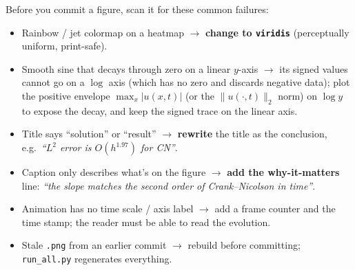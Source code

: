 \documentclass[11pt]{article}
\begin{document}
Before you commit a figure, scan it for these common failures:
\begin{itemize}[leftmargin=2em, itemsep=1pt]
  \item Rainbow / jet colormap on a heatmap $\to$ \textbf{change to
        \texttt{viridis}} (perceptually uniform, print-safe).
  \item Smooth sine that decays through zero on a linear $y$-axis $\to$
        its signed values cannot go on a $\log$ axis (which has no zero
        and discards negative data); plot the positive envelope
        $\max_x|u(x,t)|$ (or the $\|u(\cdot,t)\|_2$ norm) on $\log y$ to
        expose the decay, and keep the signed trace on the linear axis.
  \item Title says ``solution'' or ``result'' $\to$ \textbf{rewrite} the
        title as the conclusion, e.g.\ \emph{``$L^2$ error is
        $O(h^{1.97})$ for CN''}.
  \item Caption only describes what's on the figure $\to$ \textbf{add
        the why-it-matters} line: \emph{``the slope matches the second
        order of Crank--Nicolson in time''}.
  \item Animation has no time scale / axis label $\to$ add a frame
        counter and the time stamp; the reader must be able to read
        the evolution.
  \item Stale \texttt{.png} from an earlier commit $\to$ rebuild before
        committing; \texttt{run\_all.py} regenerates everything.
\end{itemize}
\end{document}
